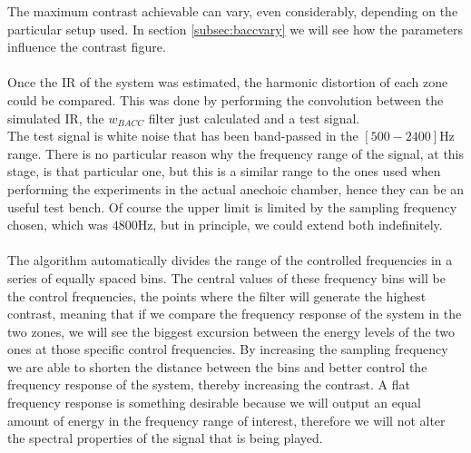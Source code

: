 The maximum contrast achievable can vary, even considerably, depending on the particular setup used. In section \ref{subsec:baccvary} we will see how the parameters influence the contrast figure.
\\
\\
Once the IR of the system was estimated, the harmonic distortion of each zone could be compared. This was done by performing the convolution between the simulated IR, the $w_{BACC}$ filter just calculated and a test signal.
\\
The test signal is white noise that has been band-passed in the $[500-2400]$Hz range. There is no particular reason why the frequency range of the signal, at this stage, is that particular one, but this is a similar range to the ones used when performing the experiments in the actual anechoic chamber, hence they can be an useful test bench. Of course the upper limit is limited by the sampling frequency chosen, which was $4800$Hz, but in principle, we could extend both indefinitely.
\\
\\
The algorithm automatically divides the range of the controlled frequencies in a series of equally spaced bins. The central values of these frequency bins will be the control frequencies, the points where the filter will generate the highest contrast, meaning that if we compare the frequency response of the system in the two zones, we will see the biggest excursion between the energy levels of the two ones at those specific control frequencies. By increasing the sampling frequency we are able to shorten the distance between the bins and better control the frequency response of the system, thereby increasing the contrast. A flat frequency response is something desirable because we will output an equal amount of energy in the frequency range of interest, therefore we will not alter the spectral properties of the signal that is being played.

